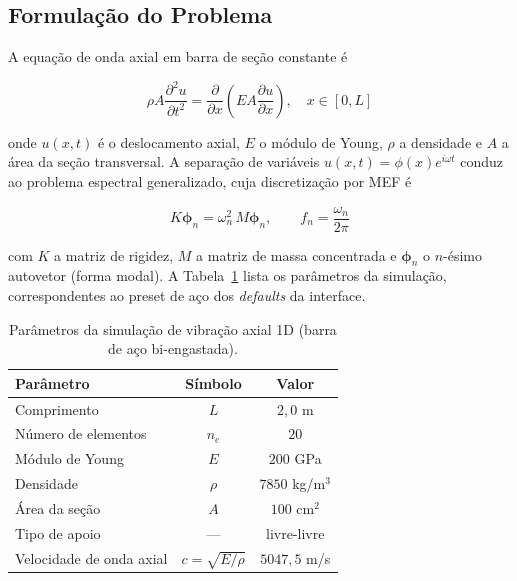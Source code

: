 \subsection{Formulação do Problema}

A equação de onda axial em barra de seção constante é

\begin{equation}
    \rho A \frac{\partial^2 u}{\partial t^2} = \frac{\partial}{\partial x}\!\left( E A \frac{\partial u}{\partial x} \right), \quad x \in [0, L]
    \label{eq:val_vibracao_edp}
\end{equation}

\noindent onde $u(x,t)$ é o deslocamento axial, $E$ o módulo de Young, $\rho$ a densidade e $A$ a área da seção transversal. A separação de variáveis $u(x,t) = \phi(x) e^{i \omega t}$ conduz ao problema espectral generalizado, cuja discretização por MEF é

\begin{equation}
    K \boldsymbol{\phi}_n = \omega_n^2 \, M \boldsymbol{\phi}_n, \qquad f_n = \frac{\omega_n}{2\pi}
    \label{eq:val_vibracao_autovalor}
\end{equation}

\noindent com $K$ a matriz de rigidez, $M$ a matriz de massa concentrada e $\boldsymbol{\phi}_n$ o $n$-ésimo autovetor (forma modal). A Tabela~\ref{tab:val_vibracao_params} lista os parâmetros da simulação, correspondentes ao preset de aço dos \emph{defaults} da interface.

\begin{table}[htbp]
    \centering
    \caption{Parâmetros da simulação de vibração axial 1D (barra de aço bi-engastada).}
    \label{tab:val_vibracao_params}
    \begin{tabular}{lcc}
        \hline
        \textbf{Parâmetro} & \textbf{Símbolo} & \textbf{Valor} \\
        \hline
        Comprimento                  & $L$  & $2{,}0$ m          \\
        Número de elementos          & $n_e$ & $20$              \\
        Módulo de Young              & $E$  & $200$ GPa          \\
        Densidade                    & $\rho$ & $7850$ kg/m$^3$  \\
        Área da seção                & $A$  & $100$ cm$^{2}$     \\
        Tipo de apoio                & ---  & livre-livre       \\
        Velocidade de onda axial     & $c = \sqrt{E/\rho}$ & $5047{,}5$ m/s \\
        \hline
    \end{tabular}
\end{table}

